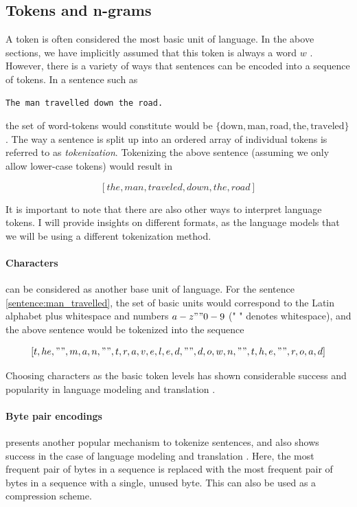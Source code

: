 \documentclass[a4paper,12pt,twoside,openright]{report}
\begin{document}
\subsection{Tokens and n-grams}

A token is often considered the most basic unit of language.
In the above sections, we have implicitly assumed that this token is always a word $w$ . 
However, there is a variety of ways that sentences can be encoded into a sequence of tokens.
In a sentence such as

\begin{verbatim}
The man travelled down the road.
\end{verbatim}\label{sentence:man_travelled}

the set of word-tokens would constitute would be $\{ \text{down}, \text{man}, \text{road}, \text{the}, \text{traveled} \}$.
The way a sentence is split up into an ordered array of individual tokens is referred to as \textit{tokenization}.
Tokenizing the above sentence (assuming we only allow lower-case tokens) would result in 

$$
[the, man, traveled, down, the, road]
$$

It is important to note that there are also other ways to interpret language tokens. 
I will provide insights on different formats, as the language models that we will be using a different tokenization method.

\paragraph{Characters} can be considered as another base unit of language.
For the sentence \eqref{sentence:man_travelled}, the set of basic units would correspond to the Latin alphabet plus whitespace and numbers $a - z" "0-9$ (" " denotes whitespace), and the above sentence would be tokenized into the sequence 

$$
[t, h e, " ", m, a, n, " ", t, r, a, v, e, l, e, d, " ", d, o, w, n, " ", t, h, e, " ", r, o, a, d]
$$

Choosing characters as the basic token levels has shown considerable success and popularity in language modeling \cite{sutskever11} and translation \cite{lee17}.

\paragraph{Byte pair encodings} \cite{gage94} presents another popular mechanism to tokenize sentences, and also shows success in the case of language modeling and translation \cite{sennrich16}. 
Here, the most frequent pair of bytes in a sequence is replaced with the most frequent pair of bytes in a sequence with a single, unused byte.
This can also be used as a compression scheme.
\end{document}
